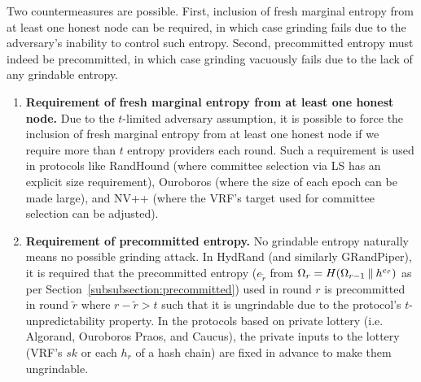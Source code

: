 Two countermeasures are possible. First, inclusion of fresh marginal entropy from at least one honest node can be required, in which case grinding fails due to the adversary's inability to control such entropy. Second, precommitted entropy must indeed be precommitted, in which case grinding vacuously fails due to the lack of any grindable entropy.
\begin{enumerate}
\item \textbf{Requirement of fresh marginal entropy from at least one honest node.} Due to the $t$-limited adversary assumption, it is possible to force the inclusion of fresh marginal entropy from at least one honest node if we require more than $t$ entropy providers each round. Such a requirement is used in protocols like RandHound (where committee selection via LS has an explicit size requirement), Ouroboros (where the size of each epoch can be made large), and NV++ (where the VRF's target used for committee selection can be adjusted).
\item \textbf{Requirement of precommitted entropy.} No grindable entropy naturally means no possible grinding attack. In HydRand (and similarly GRandPiper), it is required that the precommitted entropy ($e_{\tilde{r}}$ from $\Omega_r = H(\Omega_{r - 1} \mathbin\Vert h^{e_{\tilde{r}}})$ as per Section~\ref{subsubsection:precommitted}) used in round $r$ is precommitted in round $\tilde{r}$ where $r - \tilde{r} > t$ such that it is ungrindable due to the protocol's $t$-unpredictability property. In the protocols based on private lottery (i.e. Algorand, Ouroboros Praos, and Caucus), the private inputs to the lottery (VRF's $sk$ or each $h_r$ of a hash chain) are fixed in advance to make them ungrindable.
\end{enumerate}

